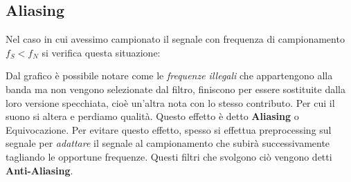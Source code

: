 \subsection{Aliasing}
Nel caso in cui avessimo campionato il segnale con frequenza di campionamento $f_S < f_N$ si verifica questa situazione:\\
\begin{center}
\end{center}
Dal grafico è possibile notare come le \textit{frequenze illegali} che appartengono alla banda ma non vengono selezionate dal filtro,
finiscono per essere sostituite dalla loro versione specchiata, cioè un'altra nota con lo stesso contributo. Per cui il suono si altera
e perdiamo qualità. Questo effetto è detto \textbf{Aliasing} o Equivocazione.
Per evitare questo effetto, spesso si effettua preprocessing sul segnale per \textit{adattare} il segnale al campionamento che subirà successivamente
tagliando le opportune frequenze. Questi filtri che svolgono ciò vengono detti \textbf{Anti-Aliasing}.